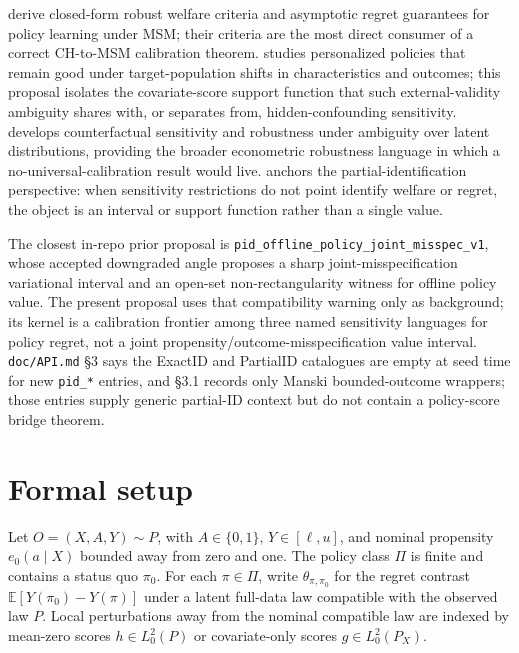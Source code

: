 \documentclass[11pt]{article}
\newcommand{\E}{\mathbb{E}}
\theoremstyle{definition}
\theoremstyle{plain}
\theoremstyle{remark}
\begin{document}
\citet{JinXuZhengZhou2025} derive closed-form robust welfare criteria and asymptotic regret guarantees for policy learning under MSM; their criteria are the most direct consumer of a correct CH-to-MSM calibration theorem.  \citet{AdjahoChristensen2025} studies personalized policies that remain good under target-population shifts in characteristics and outcomes; this proposal isolates the covariate-score support function that such external-validity ambiguity shares with, or separates from, hidden-confounding sensitivity.  \citet{ChristensenConnault2023} develops counterfactual sensitivity and robustness under ambiguity over latent distributions, providing the broader econometric robustness language in which a no-universal-calibration result would live.  \citet{Manski1990} anchors the partial-identification perspective: when sensitivity restrictions do not point identify welfare or regret, the object is an interval or support function rather than a single value.

The closest in-repo prior proposal is \texttt{pid\_offline\_policy\_joint\_misspec\_v1}, whose accepted downgraded angle proposes a sharp joint-misspecification variational interval and an open-set non-rectangularity witness for offline policy value.  The present proposal uses that compatibility warning only as background; its kernel is a calibration frontier among three named sensitivity languages for policy regret, not a joint propensity/outcome-misspecification value interval.  \texttt{doc/API.md} \S3 says the ExactID and PartialID catalogues are empty at seed time for new \texttt{pid\_*} entries, and \S3.1 records only Manski bounded-outcome wrappers; those entries supply generic partial-ID context but do not contain a policy-score bridge theorem.

\section{Formal setup}
Let $O=(X,A,Y)\sim P$, with $A\in\{0,1\}$, $Y\in[\ell,u]$, and nominal propensity $e_0(a\mid X)$ bounded away from zero and one.  The policy class $\Pi$ is finite and contains a status quo $\pi_0$.  For each $\pi\in\Pi$, write $\theta_{\pi,\pi_0}$ for the regret contrast $\E[Y(\pi_0)-Y(\pi)]$ under a latent full-data law compatible with the observed law $P$.  Local perturbations away from the nominal compatible law are indexed by mean-zero scores $h\in L^2_0(P)$ or covariate-only scores $g\in L^2_0(P_X)$.
\end{document}
